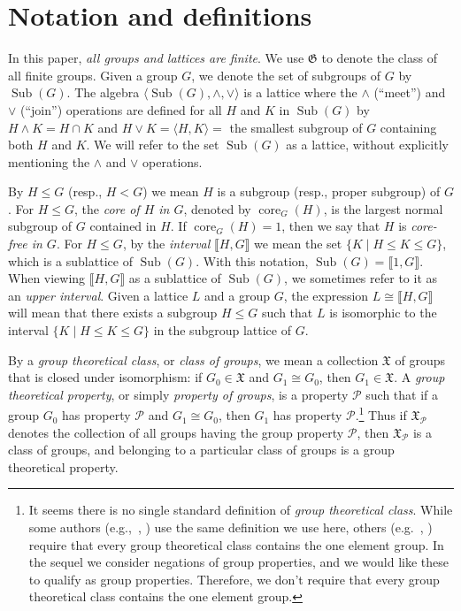 \documentclass{gen-j-l}
\newcommand{\lb}{\ensuremath{\llbracket}}
\newcommand{\rb}{\ensuremath{\rrbracket}}
\newcommand{\<}{\ensuremath{\langle}}
\renewcommand{\>}{\ensuremath{\rangle}}
\theoremstyle{plain}
\theoremstyle{definition}
\theoremstyle{remark}
\numberwithin{theorem}{section}
\numberwithin{claim}{section}
\numberwithin{equation}{section}
\numberwithin{conjecture}{section}
\newcommand{\defn}[1]{\emph{#1}}
\renewcommand{\leq}{\ensuremath{\leqslant}}
\newcommand{\meet}{\ensuremath{\wedge}}
\newcommand{\join}{\ensuremath{\vee}}
\newcommand{\Sub}{\ensuremath{\operatorname{Sub}}}
\newcommand{\core}{\ensuremath{\operatorname{core}}}
\newcommand{\2}{\ensuremath{\mathbf{2}}}
\newcommand{\3}{\ensuremath{\mathbf{3}}}
\newcommand{\sG}{\ensuremath{\mathfrak{X}}}
\newcommand{\G}{\ensuremath{\mathfrak{G}}}
\newcommand{\cP}{\ensuremath{\mathcal{P}}}
\begin{document}
\section{Notation and definitions}
\label{sec:notation-definitions}
In this paper, \emph{all groups and lattices are finite}.  We use 
$\G$ to denote the class of all finite groups.
Given a group $G$, we denote the set of subgroups of $G$ by $\Sub(G)$.  The
algebra $\<\Sub(G), \meet, \join\>$ is a lattice where the $\meet$ (``meet'') and
$\join$ (``join'') operations are defined for all $H$ and $K$ in $\Sub(G)$ by
$H\meet K = H\cap K$ and $H\join K = \<H, K\> = $ the smallest subgroup of $G$
containing both $H$ and $K$.  We will refer to the set
$\Sub(G)$ as a lattice, without explicitly mentioning the $\meet$ and
$\join$ operations.

By $H \leq G$ (resp.,
$H < G$) we mean $H$ is a subgroup (resp., proper subgroup) of $G$.
For $H\leq G$, the
\emph{core of $H$ in $G$}, denoted by $\core_G(H)$, is the largest normal subgroup of $G$
contained in $H$.
If $\core_G(H)=1$, then we say that $H$ is \emph{core-free in $G$}.
For $H\leq G$,
by the \defn{interval} $\lb H, G \rb$ we mean 
the set $\{K \mid H\leq K \leq G\}$, which is a
sublattice of $\Sub(G)$.
With this notation, $\Sub(G)=\lb 1,G \rb$.
When viewing $\lb H,G \rb$ as a
sublattice of $\Sub(G)$, we sometimes refer to it as an \defn{upper interval}. 
Given a lattice $L$ and a group $G$, the expression $L \cong \lb H, G \rb$ will
mean that there exists a subgroup $H \leq G$ such that $L$ is isomorphic to the
interval $\{K \mid H\leq K \leq G\}$ in the subgroup lattice of $G$.

By a \defn{group theoretical class}, or \defn{class of groups}, we mean a
collection $\sG$ of groups that is closed under isomorphism:
if $G_0\in \sG$ and  $G_1\cong G_0$, then $G_1\in \sG$.
A \defn{group theoretical property}, or simply \defn{property of groups},
is a property $\cP$ such that if a group $G_0$ has property $\cP$ and
$G_1\cong G_0$, then $G_1$ has property $\cP$.\footnote{It seems there
  is no single standard definition of \emph{group theoretical class}.
  While some authors (e.g.,~\cite{Doerk:1992}, \cite{BBE:2006}) use the same
  definition we use here, others (e.g.~\cite{Robinson:1996}, \cite{Rose:1978})
  require that every group theoretical class contains the one element group. 
  In the sequel we consider negations of group properties, and we would
  like these to qualify as group properties.  Therefore, we don't require
  that every group theoretical class contains the one element group.}   
Thus if $\sG_{\cP}$ denotes the collection of all groups having the group
property $\cP$, then  $\sG_{\cP}$  is a class of groups, and belonging to a
particular class of groups is a group theoretical property.
\end{document}
